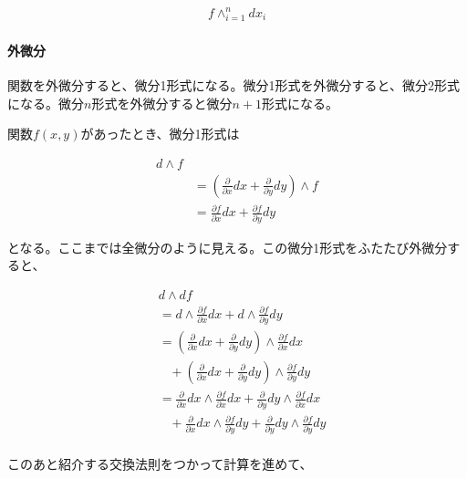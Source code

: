 \begin{equation*}
\begin{split}
f \wedge_{i=1}^{n} dx_i
\end{split}
\end{equation*}

\paragraph{外微分}

関数を外微分すると、微分1形式になる。微分1形式を外微分すると、微分2形式になる。微分$n$形式を外微分すると微分$n+1$形式になる。

関数$f(x,y)$があったとき、微分1形式は

\begin{equation*}
\begin{split}
d \wedge f \\
&= (\frac{\partial}{\partial x} dx + \frac{\partial}{\partial y} dy) \wedge f\\
&= \frac{\partial f}{\partial x} dx + \frac{\partial f}{\partial y} dy
\end{split}
\end{equation*}

となる。ここまでは全微分のように見える。この微分1形式をふたたび外微分すると、

\begin{equation*}
\begin{split}
&d \wedge df \\
&= d \wedge \frac{\partial f}{\partial x} dx + d \wedge \frac{\partial f}{\partial y} dy \\
&= (\frac{\partial}{\partial x} dx + \frac{\partial}{\partial y} dy) \wedge \frac{\partial f}{\partial x} dx \\
& \; \; \; + (\frac{\partial}{\partial x} dx + \frac{\partial}{\partial y} dy) \wedge \frac{\partial f}{\partial y} dy \\
&= \frac{\partial}{\partial x} dx \wedge \frac{\partial f}{\partial x} dx 
+ \frac{\partial}{\partial y} dy \wedge \frac{\partial f}{\partial x} dx \\
& \; \; \; + \frac{\partial}{\partial x} dx \wedge \frac{\partial f}{\partial y} dy 
+ \frac{\partial}{\partial y} dy \wedge \frac{\partial f}{\partial y} dy \\
\end{split}
\end{equation*}

このあと紹介する交換法則をつかって計算を進めて、

